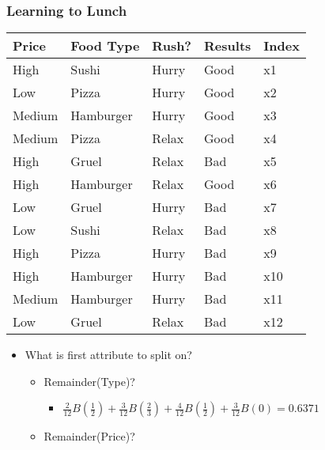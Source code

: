 \documentclass[compress, 9pt]{beamer}
\begin{document}
\begin{frame}
\frametitle{Learning to Lunch}
\label{sec-2-3}

\small

\begin{center}
\begin{tabular}{lllll}
\hline
 Price   &  Food Type  &  Rush?  &  Results  &  Index  \\
\hline
 High    &  Sushi      &  Hurry  &  Good     &  x1     \\
 Low     &  Pizza      &  Hurry  &  Good     &  x2     \\
 Medium  &  Hamburger  &  Hurry  &  Good     &  x3     \\
 Medium  &  Pizza      &  Relax  &  Good     &  x4     \\
 High    &  Gruel      &  Relax  &  Bad      &  x5     \\
 High    &  Hamburger  &  Relax  &  Good     &  x6     \\
 Low     &  Gruel      &  Hurry  &  Bad      &  x7     \\
 Low     &  Sushi      &  Relax  &  Bad      &  x8     \\
 High    &  Pizza      &  Hurry  &  Bad      &  x9     \\
 High    &  Hamburger  &  Hurry  &  Bad      &  x10    \\
 Medium  &  Hamburger  &  Hurry  &  Bad      &  x11    \\
 Low     &  Gruel      &  Relax  &  Bad      &  x12    \\
\hline
\end{tabular}
\end{center}
\begin{itemize}

\item What is first attribute to split on?
\label{sec-2-3-1}%
\begin{itemize}

\item <2-> Remainder(Type)?
\label{sec-2-3-1-1}%
\begin{itemize}

\item <3-> $\frac{2}{12}B(\frac{1}{2}) + \frac{3}{12}B(\frac{2}{3})+\frac{4}{12}B(\frac{1}{2})+\frac{3}{12}B(0) = 0.6371$
\label{sec-2-3-1-1-1}%
\end{itemize} %

\item <4-> Remainder(Price)?
\label{sec-2-3-1-2}%
\begin{itemize}


\end{itemize}
\end{itemize}
\end{itemize}
\end{frame}
\end{document}
